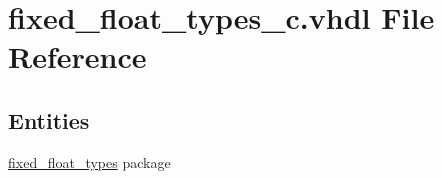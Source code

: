 \hypertarget{fixed__float__types__c_8vhdl}{}\section{fixed\+\_\+float\+\_\+types\+\_\+c.\+vhdl File Reference}
\label{fixed__float__types__c_8vhdl}
\subsection*{Entities}
\begin{DoxyCompactItemize}
\item 
\hyperlink{classfixed__float__types}{fixed\+\_\+float\+\_\+types} package
\end{DoxyCompactItemize}
